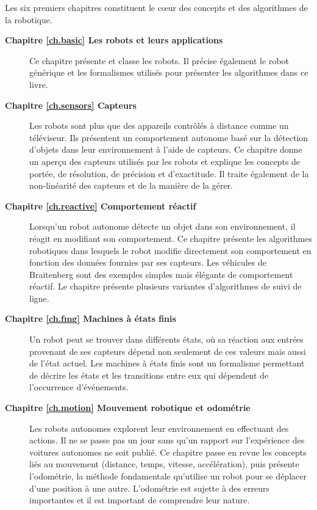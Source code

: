 {Les six premiers chapitres constituent le cœur des concepts et des algorithmes de la robotique.
\begin{description}
\item [\textbf{Chapitre \ref{ch.basic} Les robots et leurs applications}] Ce chapitre présente et classe les robots. Il précise également le robot générique et les formalismes utilisés pour présenter les algorithmes dans ce livre.
\smallskip
\item [\textbf{Chapitre \ref{ch.sensors} Capteurs}] Les robots sont plus que des appareils contrôlés à distance comme un téléviseur. Ils présentent un comportement autonome basé sur la détection d'objets dans leur environnement à l'aide de capteurs. Ce chapitre donne un aperçu des capteurs utilisés par les robots et explique les concepts de portée, de résolution, de précision et d'exactitude. Il traite également de la non-linéarité des capteurs et de la manière de la gérer.
\smallskip
\item [\textbf{Chapitre \ref{ch.reactive} Comportement réactif}] Lorsqu'un robot autonome détecte un objet dans son environnement, il réagit en modifiant son comportement. Ce chapitre présente les algorithmes robotiques dans lesquels le robot modifie directement son comportement en fonction des données fournies par ses capteurs. Les véhicules de Braitenberg sont des exemples simples mais élégants de comportement réactif. Le chapitre présente plusieurs variantes d'algorithmes de suivi de ligne.
\smallskip
\item [\textbf{Chapitre \ref{ch.fmg} Machines à états finis}] Un robot peut se trouver dans différents états, où sa réaction aux entrées provenant de ses capteurs dépend non seulement de ces valeurs mais aussi de l'état actuel. Les machines à états finis sont un formalisme permettant de décrire les états et les transitions entre eux qui dépendent de l'occurrence d'événements.
\smallskip
\item [\textbf{Chapitre \ref{ch.motion} Mouvement robotique et odométrie}] Les robots autonomes explorent leur environnement en effectuant des actions. Il ne se passe pas un jour sans qu'un rapport sur l'expérience des voitures autonomes ne soit publié. Ce chapitre passe en revue les concepts liés au mouvement (distance, temps, vitesse, accélération), puis présente l'odométrie, la méthode fondamentale qu'utilise un robot pour se déplacer d'une position à une autre. L'odométrie est sujette à des erreurs importantes et il est important de comprendre leur nature.


\end{description}}
